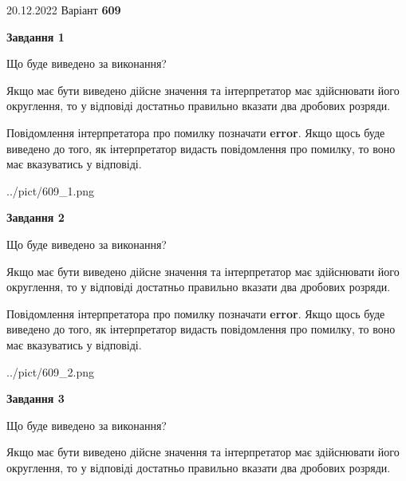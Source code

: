 \documentclass[12pt, ukrainian]{article}
\begin{document}
{20.12.2022 Варіант \No \textbf { 609 }\par}
{
\begin {Large}

{\begin {center}\textbf{Завдання 1}\end {center}}\par
Що буде виведено за виконання? \par

Якщо має бути виведено дійсне значення та інтерпретатор має здійснювати його округлення, 
то у відповіді достатньо правильно вказати два дробових розряди.

Повідомлення інтерпретатора про помилку позначати \textbf{error}.
Якщо щось буде виведено до того, як інтерпретатор видасть повідомлення про помилку, 
то воно має вказуватись у відповіді. \par

\begin{center}
	{../pict/609_1.png}
\end{center}
\newpage

{\begin {center}\textbf{Завдання 2}\end {center}}\par
Що буде виведено за виконання? \par

Якщо має бути виведено дійсне значення та інтерпретатор має здійснювати його округлення, 
то у відповіді достатньо правильно вказати два дробових розряди.

Повідомлення інтерпретатора про помилку позначати \textbf{error}.
Якщо щось буде виведено до того, як інтерпретатор видасть повідомлення про помилку, 
то воно має вказуватись у відповіді. \par

\begin{center}
	{../pict/609_2.png}
\end{center}
\newpage

{\begin {center}\textbf{Завдання 3}\end {center}}\par
Що буде виведено за виконання? \par

Якщо має бути виведено дійсне значення та інтерпретатор має здійснювати його округлення, 
то у відповіді достатньо правильно вказати два дробових розряди.


\end{Large}}
\end{document}

